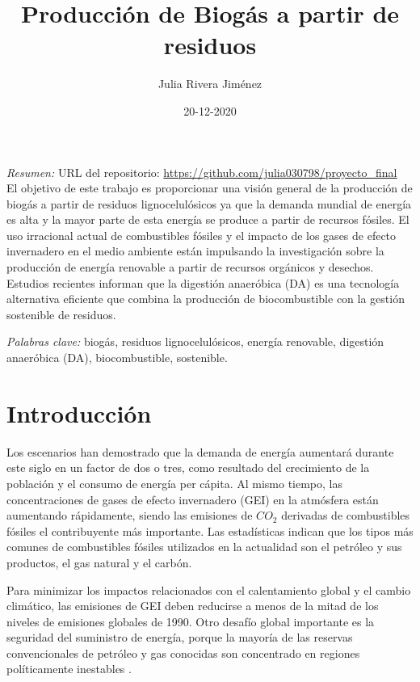 \documentclass[a4paper,10pt]{article}
\begin{document}
\title{Producción de Biogás a partir de residuos}
\author{Julia Rivera Jiménez}
\date{20-12-2020}
\maketitle
\setlength{\parskip}{4mm}

{\em Resumen:} 
URL del repositorio: \url{https://github.com/julia030798/proyecto_final} \\
El objetivo de este trabajo es proporcionar una visión general de la producción de biogás a partir de residuos lignocelulósicos ya que la demanda mundial de energía es alta y la mayor parte de esta energía se produce a partir de recursos fósiles. El uso irracional actual de combustibles fósiles y el impacto de los gases de efecto invernadero en el medio ambiente están impulsando la investigación sobre la producción de energía renovable a partir de recursos orgánicos y desechos. Estudios recientes informan que la digestión anaeróbica (DA) es una tecnología alternativa eficiente que combina la producción de biocombustible con la gestión sostenible de residuos.

{\em Palabras clave:}
biogás, residuos lignocelulósicos, energía renovable, digestión anaeróbica (DA), biocombustible, sostenible.

\section{Introducción}
Los escenarios han demostrado que la demanda de energía aumentará durante este siglo en un factor de dos o tres, como resultado del crecimiento de la población y el consumo de energía per cápita. Al mismo tiempo, las concentraciones de gases de efecto invernadero (GEI) en la atmósfera están aumentando rápidamente, siendo las emisiones de $CO_{2}$ derivadas de combustibles fósiles el contribuyente más importante. Las estadísticas indican que los tipos más comunes de combustibles fósiles utilizados en la actualidad son el petróleo y sus productos, el gas natural y el carbón.

Para minimizar los impactos relacionados con el calentamiento global y el cambio climático, las emisiones de GEI deben reducirse a menos de la mitad de los niveles de emisiones globales de 1990. Otro desafío global importante es la seguridad del suministro de energía, porque la mayoría de las reservas convencionales de petróleo y gas conocidas son concentrado en regiones políticamente inestables \cite{Weiland2010}. 
\end{document}
